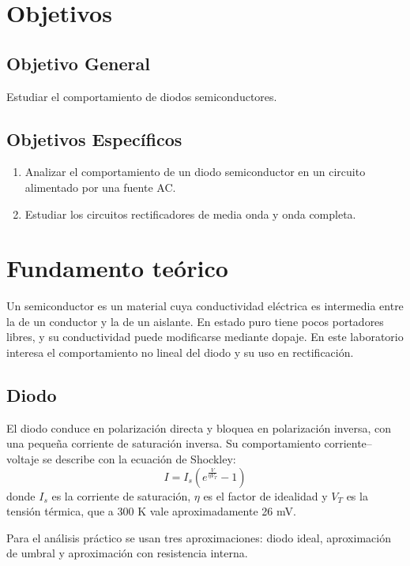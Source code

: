 \documentclass[12pt,a4paper]{article}
\begin{document}
\makeInformePortada
\setcounter{page}{1}
\tableofcontents
\newpage

\section{Objetivos}
\subsection{Objetivo General}
Estudiar el comportamiento de diodos semiconductores.

\subsection{Objetivos Específicos}
\begin{enumerate}
\item Analizar el comportamiento de un diodo semiconductor en un circuito alimentado por una fuente AC.
\item Estudiar los circuitos rectificadores de media onda y onda completa.
\end{enumerate}

\section{Fundamento teórico}
Un semiconductor es un material cuya conductividad eléctrica es intermedia entre la de un conductor y la de un aislante. En estado puro tiene pocos portadores libres, y su conductividad puede modificarse mediante dopaje. En este laboratorio interesa el comportamiento no lineal del diodo y su uso en rectificación.

\subsection{Diodo}
El diodo conduce en polarización directa y bloquea en polarización inversa, con una pequeña corriente de saturación inversa. Su comportamiento corriente--voltaje se describe con la ecuación de Shockley:
\begin{equation}
I = I_s\left(e^{\frac{V}{\eta V_T}} - 1\right)
\end{equation}
donde $I_s$ es la corriente de saturación, $\eta$ es el factor de idealidad y $V_T$ es la tensión térmica, que a 300 K vale aproximadamente 26 mV.

Para el análisis práctico se usan tres aproximaciones: diodo ideal, aproximación de umbral y aproximación con resistencia interna.
\end{document}

